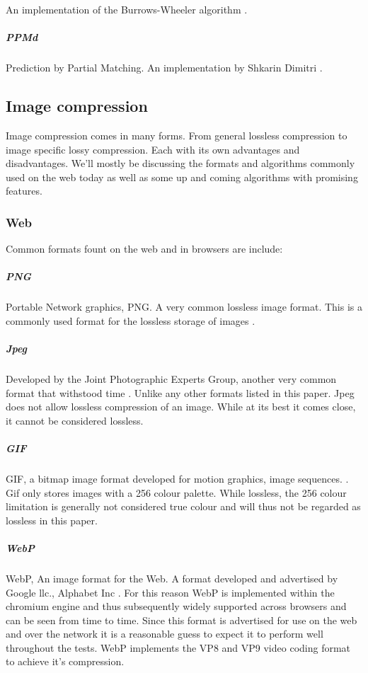 \documentclass[11pt,a4paper]{report}
\begin{document}
An implementation of the Burrows-Wheeler algorithm \cite{bzip2}.

\subparagraph{PPMd}

Prediction by Partial Matching. An implementation by Shkarin Dimitri \cite{ppmd}.

\subsection{Image compression}

Image compression comes in many forms. From general lossless compression to image specific lossy compression. Each with its own advantages and disadvantages. We'll mostly be discussing the  formats and algorithms commonly used on the web today as well as some up and coming algorithms with promising features.

\subsubsection{Web}

Common formats fount on the web and in browsers are include:

\subparagraph{PNG}

Portable Network graphics, PNG. A very common lossless image format. This is a commonly used format for the lossless storage of images \cite{pngspec}.
    
\subparagraph{Jpeg}

Developed by the Joint Photographic Experts Group, another very common format that withstood time \cite{jpeg}. Unlike any other formats listed in this paper. Jpeg does not allow lossless compression of an image. While at its best it comes close, it cannot be considered lossless.

\subparagraph{GIF}

GIF, a bitmap image format developed for motion graphics, image sequences. \cite{gif}. Gif only stores images with a 256 colour palette. While lossless, the 256 colour limitation is generally not considered true colour and will thus not be regarded as lossless in this paper.
    
\subparagraph{WebP}

WebP, An image format for the Web. A format developed and advertised by Google llc., Alphabet Inc \cite{webp}. For this reason WebP is implemented within the chromium engine and thus subsequently widely supported across browsers and can be seen from time to time. Since this format is advertised for use on the web and over the network it is a reasonable guess to expect it to perform well throughout the tests. WebP implements the VP8 and VP9 video coding format to achieve it's compression.
\end{document}
